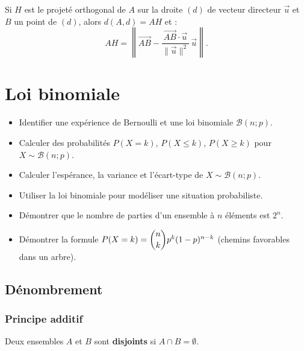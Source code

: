 \documentclass[11pt,a4paper,openany]{book}
\theoremstyle{definition}
\newcommand{\vc}[1]{\overrightarrow{#1}}
\newcommand{\nchap}{
    \setcounter{Définition}{0}
    \setcounter{Propriété}{0}
    \setcounter{Théorème}{0}
    \setcounter{Remarque}{0}
    \setcounter{Exemple}{0}
}
\begin{document}
    \begin{Propriété}
        Si $H$ est le projeté orthogonal de $A$ sur la droite $(d)$ de vecteur directeur
        $\vc{u}$ et $B$ un point de $(d)$, alors $d(A,d)=AH$ et :
        \[
            AH=\left\|\vc{AB}-\frac{\vc{AB}\cdot\vc{u}}{\|\vc{u}\|^2}\,\vc{u}\right\|.
        \]
    \end{Propriété}

    \chapter{Loi binomiale}
    \nchap

    \begin{capacitesbox}
    \begin{itemize}
        \item Identifier une expérience de Bernoulli et une loi binomiale $\mathcal{B}(n;p)$.
        \item Calculer des probabilités $P(X=k)$, $P(X\leq k)$, $P(X\geq k)$ pour $X\sim\mathcal{B}(n;p)$.
        \item Calculer l'espérance, la variance et l'écart-type de $X\sim\mathcal{B}(n;p)$.
        \item Utiliser la loi binomiale pour modéliser une situation probabiliste.
    \end{itemize}
    \end{capacitesbox}

    \begin{demoprogbox}
    \begin{itemize}
        \item Démontrer que le nombre de parties d'un ensemble à $n$ éléments est $2^n$.
        \item Démontrer la formule $P(X=k)=\dbinom{n}{k}p^k(1-p)^{n-k}$ (chemins favorables dans un arbre).
    \end{itemize}
    \end{demoprogbox}

    \section{Dénombrement}
    \subsection{Principe additif}
    \begin{Définition}
        Deux ensembles $A$ et $B$ sont \textbf{disjoints} si $A\cap B=\emptyset$.
    \end{Définition}
\end{document}
